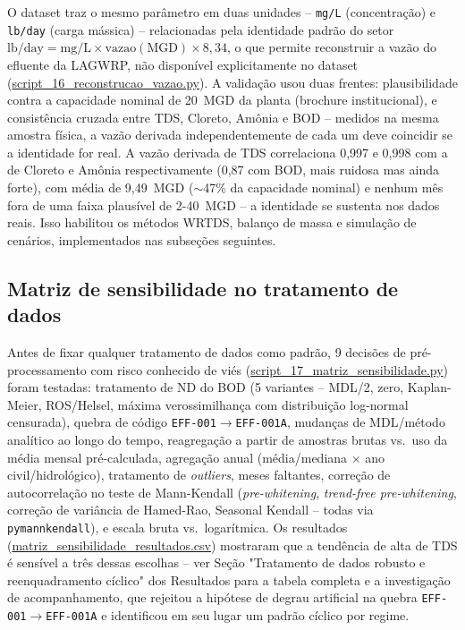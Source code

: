 O dataset traz o mesmo parâmetro em duas unidades -- \texttt{mg/L} (concentração) e \texttt{lb/day} (carga mássica) -- relacionadas pela identidade padrão do setor $\mathrm{lb/day} = \mathrm{mg/L} \times \mathrm{vazao(MGD)} \times 8{,}34$, o que permite reconstruir a vazão do efluente da LAGWRP, não disponível explicitamente no dataset (\url{script_16_reconstrucao_vazao.py}). A validação usou duas frentes: plausibilidade contra a capacidade nominal de 20~MGD da planta (brochure institucional), e consistência cruzada entre TDS, Cloreto, Amônia e BOD -- medidos na mesma amostra física, a vazão derivada independentemente de cada um deve coincidir se a identidade for real. A vazão derivada de TDS correlaciona 0,997 e 0,998 com a de Cloreto e Amônia respectivamente (0,87 com BOD, mais ruidosa mas ainda forte), com média de 9,49~MGD ($\sim$47\% da capacidade nominal) e nenhum mês fora de uma faixa plausível de 2-40~MGD -- a identidade se sustenta nos dados reais. Isso habilitou os métodos WRTDS, balanço de massa e simulação de cenários, implementados nas subseções seguintes.

\subsection{Matriz de sensibilidade no tratamento de dados}

Antes de fixar qualquer tratamento de dados como padrão, 9 decisões de pré-processamento com risco conhecido de viés (\url{script_17_matriz_sensibilidade.py}) foram testadas: tratamento de ND do BOD (5 variantes -- MDL/2, zero, Kaplan-Meier, ROS/Helsel, máxima verossimilhança com distribuição log-normal censurada), quebra de código \texttt{EFF-001}$\to$\texttt{EFF-001A}, mudanças de MDL/método analítico ao longo do tempo, reagregação a partir de amostras brutas vs.\ uso da média mensal pré-calculada, agregação anual (média/mediana $\times$ ano civil/hidrológico), tratamento de \textit{outliers}, meses faltantes, correção de autocorrelação no teste de Mann-Kendall (\textit{pre-whitening}, \textit{trend-free pre-whitening}, correção de variância de Hamed-Rao, Seasonal Kendall -- todas via \texttt{pymannkendall}), e escala bruta vs.\ logarítmica. Os resultados (\url{matriz_sensibilidade_resultados.csv}) mostraram que a tendência de alta de TDS é sensível a três dessas escolhas -- ver Seção "Tratamento de dados robusto e reenquadramento cíclico" dos Resultados para a tabela completa e a investigação de acompanhamento, que rejeitou a hipótese de degrau artificial na quebra \texttt{EFF-001}$\to$\texttt{EFF-001A} e identificou em seu lugar um padrão cíclico por regime.

